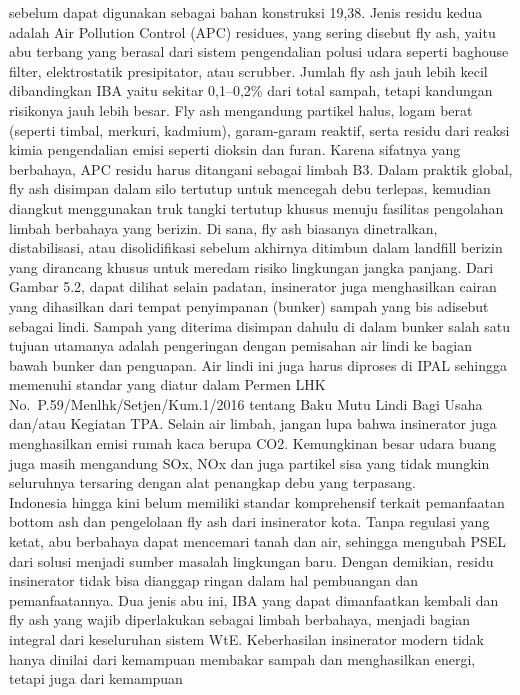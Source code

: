 \documentclass[
  letterpaper,
  DIV=11,
  numbers=noendperiod]{scrreprt}
\begin{document}
sebelum dapat digunakan sebagai bahan konstruksi 19,38. Jenis residu
kedua adalah Air Pollution Control (APC) residues, yang sering disebut
fly ash, yaitu abu terbang yang berasal dari sistem pengendalian polusi
udara seperti baghouse filter, elektrostatik presipitator, atau
scrubber. Jumlah fly ash jauh lebih kecil dibandingkan IBA yaitu sekitar
0,1--0,2\% dari total sampah, tetapi kandungan risikonya jauh lebih
besar. Fly ash mengandung partikel halus, logam berat (seperti timbal,
merkuri, kadmium), garam-garam reaktif, serta residu dari reaksi kimia
pengendalian emisi seperti dioksin dan furan. Karena sifatnya yang
berbahaya, APC residu harus ditangani sebagai limbah B3. Dalam praktik
global, fly ash disimpan dalam silo tertutup untuk mencegah debu
terlepas, kemudian diangkut menggunakan truk tangki tertutup khusus
menuju fasilitas pengolahan limbah berbahaya yang berizin. Di sana, fly
ash biasanya dinetralkan, distabilisasi, atau disolidifikasi sebelum
akhirnya ditimbun dalam landfill berizin yang dirancang khusus untuk
meredam risiko lingkungan jangka panjang. Dari Gambar 5.2, dapat dilihat
selain padatan, insinerator juga menghasilkan cairan yang dihasilkan
dari tempat penyimpanan (bunker) sampah yang bis adisebut sebagai lindi.
Sampah yang diterima disimpan dahulu di dalam bunker salah satu tujuan
utamanya adalah pengeringan dengan pemisahan air lindi ke bagian bawah
bunker dan penguapan. Air lindi ini juga harus diproses di IPAL sehingga
memenuhi standar yang diatur dalam Permen LHK
No.~P.59/Menlhk/Setjen/Kum.1/2016 tentang Baku Mutu Lindi Bagi Usaha
dan/atau Kegiatan TPA. Selain air limbah, jangan lupa bahwa insinerator
juga menghasilkan emisi rumah kaca berupa CO2. Kemungkinan besar udara
buang juga masih mengandung SOx, NOx dan juga partikel sisa yang tidak
mungkin seluruhnya tersaring dengan alat penangkap debu yang
terpasang.\\
Indonesia hingga kini belum memiliki standar komprehensif terkait
pemanfaatan bottom ash dan pengelolaan fly ash dari insinerator kota.
Tanpa regulasi yang ketat, abu berbahaya dapat mencemari tanah dan air,
sehingga mengubah PSEL dari solusi menjadi sumber masalah lingkungan
baru. Dengan demikian, residu insinerator tidak bisa dianggap ringan
dalam hal pembuangan dan pemanfaatannya. Dua jenis abu ini, IBA yang
dapat dimanfaatkan kembali dan fly ash yang wajib diperlakukan sebagai
limbah berbahaya, menjadi bagian integral dari keseluruhan sistem WtE.
Keberhasilan insinerator modern tidak hanya dinilai dari kemampuan
membakar sampah dan menghasilkan energi, tetapi juga dari kemampuan
\end{document}
